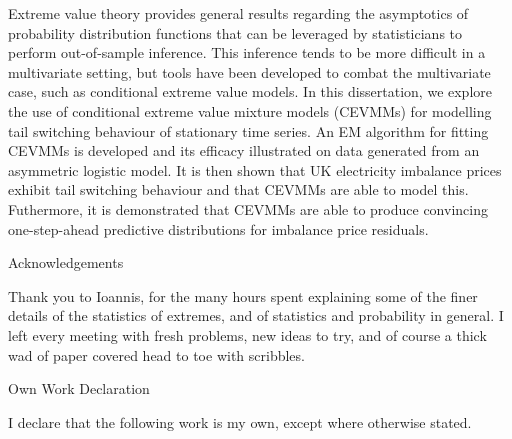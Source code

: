 \documentclass[11pt,twoside,openany]{book}
\numberwithin{Theorem}{chapter}
\numberwithin{Definition}{chapter}
\numberwithin{Lemma}{chapter}
\numberwithin{Algorithm}{chapter}
\numberwithin{equation}{chapter}
\begin{document}
Extreme value theory provides general results regarding the asymptotics of
probability distribution functions that can be leveraged by statisticians to
perform out-of-sample inference. This inference tends to be more difficult in a
multivariate setting, but tools have been developed to combat the multivariate
case, such as conditional extreme value models. In this dissertation, we explore
the use of conditional extreme value mixture models (CEVMMs) for modelling
tail switching behaviour of stationary time series.
An EM algorithm for fitting  CEVMMs is developed and its efficacy
illustrated on data generated from an asymmetric logistic model.
It is then shown that UK electricity imbalance prices exhibit tail switching
behaviour and that CEVMMs are able to model this. Futhermore,
it is demonstrated that CEVMMs are able to produce convincing one-step-ahead
predictive distributions for imbalance price residuals.




\clearpage

\begin{center}
\Large{Acknowledgements}
\end{center}

Thank you to Ioannis, for the many hours spent explaining some of the finer
details of the statistics of extremes, and of statistics and probability in
general. I left every meeting with fresh problems, new ideas to try, and of course a
thick wad of paper covered head to toe with scribbles.

\clearpage

\begin{center}
\Large{Own Work Declaration}
\end{center}

I declare that the following work is my own, except where otherwise stated.



\clearpage



\pagestyle{memo}
\end{document}
